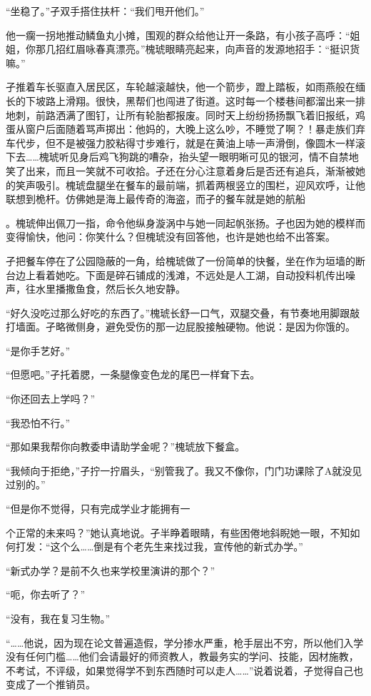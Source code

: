 \documentclass{article}
\begin{document}
“坐稳了。”孑双手搭住扶杆：“我们甩开他们。”

他一瘸一拐地推动鳞鱼丸小摊，围观的群众给他让开一条路，有小孩子高呼：“姐姐，你那几招红眉咏春真漂亮。”槐琥眼睛亮起来，向声音的发源地招手：“挺识货嘛。”

孑推着车长驱直入居民区，车轮越滚越快，他一个箭步，蹬上踏板，如雨燕般在缅长的下坡路上滑翔。很快，黑帮们也闯进了街道。这时每一个楼巷间都溜出来一排地刺，前路洒满了图钉，让所有轮胎都报废。同时天上纷纷扬扬飘飞着旧报纸，鸡蛋从窗户后面随着骂声掷出：他妈的，大晚上这么吵，不睡觉了啊？！暴走族们弃车代步，但不是被强力胶粘得寸步难行，就是在黄油上哧一声滑倒，像圆木一样滚下去……槐琥听见身后鸡飞狗跳的嘈杂，抬头望一眼明晰可见的银河，情不自禁地笑了出来，而且一笑就不可收拾。孑还在分心注意着身后是否还有追兵，渐渐被她的笑声吸引。槐琥盘腿坐在餐车的最前端，抓着两根竖立的围栏，迎风欢呼，让他联想到桅杆。仿佛她是海上最传奇的海盗，而孑的餐车就是她的航船

\newpage 

。槐琥伸出佩刀一指，命令他纵身漩涡中与她一同起帆张扬。孑也因为她的模样而变得愉快，他问：你笑什么？但槐琥没有回答他，也许是她也给不出答案。

孑把餐车停在了公园隐蔽的一角，给槐琥做了一份简单的快餐，坐在作为垣墙的断台边上看着她吃。下面是碎石铺成的浅滩，不远处是人工湖，自动投料机传出噪声，往水里播撒鱼食，然后长久地安静。

“好久没吃过那么好吃的东西了。”槐琥长舒一口气，双腿交叠，有节奏地用脚跟敲打墙面。孑略微侧身，避免受伤的那一边屁股接触硬物。他说：是因为你饿的。

“是你手艺好。”

“但愿吧。”孑托着腮，一条腿像变色龙的尾巴一样耷下去。

“你还回去上学吗？”

“我恐怕不行。”

“那如果我帮你向教委申请助学金呢？”槐琥放下餐盒。

“我倾向于拒绝，”孑拧一拧眉头，“别管我了。我又不像你，门门功课除了A就没见过别的。”

“但是你不觉得，只有完成学业才能拥有一

\newpage 

个正常的未来吗？”她认真地说。孑半睁着眼睛，有些困倦地斜睨她一眼，不知如何打发：“这个么……倒是有个老先生来找过我，宣传他的新式办学。”

“新式办学？是前不久也来学校里演讲的那个？”

“呃，你去听了？”

“没有，我在复习生物。”

“……他说，因为现在论文普遍造假，学分掺水严重，枪手层出不穷，所以他们入学没有任何门槛……他们会请最好的师资教人，教最务实的学问、技能，因材施教，不考试，不评级，如果觉得学不到东西随时可以走人……”说着说着，孑觉得自己也变成了一个推销员。
\end{document}
